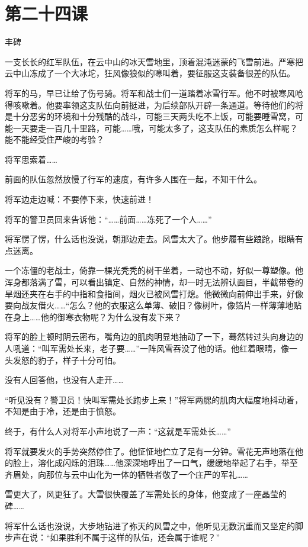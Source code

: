 \documentclass[12pt,UTF8]{ctexbook}
\begin{document}
\section{第二十四课}

丰碑

一支长长的红军队伍，在云中山的冰天雪地里，顶着混沌迷蒙的飞雪前进。严寒把云中山冻成了一个大冰坨，狂风像狼似的嗥叫着，要征服这支装备很差的队伍。

将军的马，早已让给了伤号骑。将军和战士们一道踏着冰雪行军。他不时被寒风呛得咳嗽着。他要率领这支队伍向前挺进，为后续部队开辟一条通道。等待他们的将是十分恶劣的环境和十分残酷的战斗，可能三天两头吃不上饭，可能要睡雪窝，可能一天要走一百几十里路，可能……哦，可能太多了，这支队伍的素质怎么样呢？能不能经受住严峻的考验？

将军思索着……

前面的队伍忽然放慢了行军的速度，有许多人围在一起，不知干什么。

将军边走边喊：不要停下来，快速前进！

将军的警卫员回来告诉他：“……前面……冻死了一个人……”

将军愣了愣，什么话也没说，朝那边走去。风雪太大了。他步履有些踉跄，眼睛有点迷离。

一个冻僵的老战士，倚靠一棵光秃秃的树干坐着，一动也不动，好似一尊塑像。他浑身都落满了雪，可以看出镇定、自然的神情，却一时无法辨认面目，半截带卷的旱烟还夹在右手的中指和食指间，烟火已被风雪打熄。他微微向前伸出手来，好像要向战友借火……“怎么？他的衣服这么单薄、破旧？像树叶，像箔片一样薄薄地贴在身上……他的御寒衣物呢？为什么没有发下来？

将军的脸上顿时阴云密布，嘴角边的肌肉明显地抽动了一下，蓦然转过头向身边的人吼道：“叫军需处长来，老子要……”一阵风雪吞没了他的话。他红着眼睛，像一头发怒的豹子，样子十分可怕。

没有人回答他，也没有人走开……

“听见没有？警卫员！快叫军需处长跑步上来！”将军两腮的肌肉大幅度地抖动着，不知是由于冷，还是由于愤怒。

终于，有什么人对将军小声地说了一声：“这就是军需处长……”

将军就要发火的手势突然停住了。他怔怔地伫立了足有一分钟。雪花无声地落在他的脸上，溶化成闪烁的泪珠……他深深地呼出了一口气，缓缓地举起了右手，举至齐眉处，向那位与云中山化为一体的牺牲者敬了一个庄严的军礼……

雪更大了，风更狂了。大雪很快覆盖了军需处长的身体，他变成了一座晶莹的碑……

将军什么话也没说，大步地钻进了弥天的风雪之中，他听见无数沉重而又坚定的脚步声在说：“如果胜利不属于这样的队伍，还会属于谁呢？”
\end{document}
